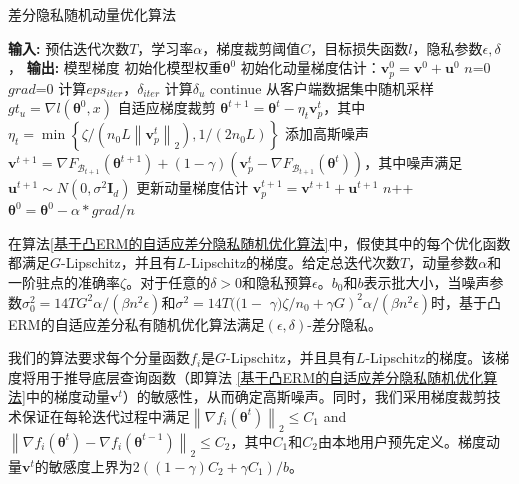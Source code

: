 \begin{algorithm}[!htb]
	\caption{差分隐私随机动量优化算法}
	\label{基于凸ERM的自适应差分隐私随机优化算法}{}
	\begin{algorithmic}[1]
		\footnotesize
		\STATE \textbf{输入:} 预估迭代次数$T$，学习率$\alpha$，梯度裁剪阈值$C$，目标损失函数$l$，隐私参数$\epsilon, \delta$，
		\STATE \textbf{输出:} 模型梯度
		\STATE 初始化模型权重$\boldsymbol{\theta}^{0}$
		\STATE 初始化动量梯度估计：$\mathbf{v}_{p}^{0}=\mathbf{v}^{0}+\mathbf{u}^{0}$
			\STATE $n$=0
			\STATE $grad$=0
			\STATE 计算$eps_{iter}$，$\delta_{iter}$
				\STATE 计算$\delta_{u}$
					\STATE continue
				\ENDIF
				\STATE 从客户端数据集中随机采样
				\STATE $g t_{u}=\nabla l(\boldsymbol{\theta}^{0}, x)$
				\STATE 自适应梯度裁剪
				\STATE $\boldsymbol{\theta}^{t+1}=\boldsymbol{\theta}^{t}-\eta_{t} \mathbf{v}_{p}^{t}$，其中$\eta_{t}=\min \left\{\zeta /\left(n_{0} L\left\|\mathbf{v}_{p}^{t}\right\|_{2}\right), 1 /\left(2 n_{0} L\right)\right\}$
				\STATE 添加高斯噪声
				\STATE $\mathbf{v}^{t+1}=\nabla F_{\mathcal{B}_{t+1}}\left(\boldsymbol{\theta}^{t+1}\right)+(1-\gamma)\left(\mathbf{v}_{p}^{t}-\nabla F_{\mathcal{B}_{t+1}}\left(\boldsymbol{\theta}^{t}\right)\right)$，其中噪声满足$\mathbf{u}^{t+1} \sim N\left(0, \sigma^{2} \mathbf{I}_{d}\right)$
				\STATE 更新动量梯度估计
				\STATE $\mathbf{v}_{p}^{t+1}=\mathbf{v}^{t+1}+\mathbf{u}^{t+1}$
				\STATE $n$++
			\ENDFOR
			\STATE $\boldsymbol{\theta}^{0}=\boldsymbol{\theta}^{0}-\alpha * g r a d / n$
		\ENDWHILE
	\end{algorithmic}
\end{algorithm}

在算法\ref{基于凸ERM的自适应差分隐私随机优化算法}中，假使其中的每个优化函数都满足$G$-Lipschitz，并且有$L$-Lipschitz的梯度。给定总迭代次数$T$，动量参数$\alpha$和一阶驻点的准确率$\zeta$。对于任意的$\delta>0$和隐私预算$\epsilon$。$b_{0}$和$b$表示批大小，当噪声参数$\sigma_{0}^{2}=14 T G^{2} \alpha /\left(\beta n^{2} \epsilon\right)$和$\sigma^{2}=14 T((1-$ $\left.\gamma) \zeta / n_{0}+\gamma G\right)^{2} \alpha /\left(\beta n^{2} \epsilon\right)$时，基于凸ERM的自适应差分私有随机优化算法满足$(\epsilon, \delta)$-差分隐私。

我们的算法要求每个分量函数$f_{i}$是$G$-Lipschitz，并且具有$L$-Lipschitz的梯度。该梯度将用于推导底层查询函数（即算法 \ref{基于凸ERM的自适应差分隐私随机优化算法}中的梯度动量$\mathbf{v}^{t}$）的敏感性，从而确定高斯噪声。同时，我们采用梯度裁剪技术保证在每轮迭代过程中满足$\left\|\nabla f_{i}\left(\boldsymbol{\theta}^{t}\right)\right\|_{2} \leq C_{1}$ and $\left\|\nabla f_{i}\left(\boldsymbol{\theta}^{t}\right)-\nabla f_{i}\left(\boldsymbol{\theta}^{t-1}\right)\right\|_{2} \leq C_{2}$，其中$C_{1}$和$C_{2}$由本地用户预先定义。梯度动量$\mathbf{v}^{t}$的敏感度上界为$2\left((1-\gamma) C_{2}+\gamma C_{1}\right) / b$。

